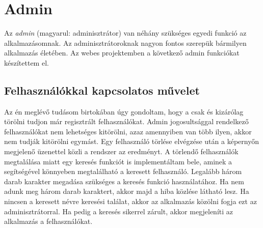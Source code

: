 \documentclass[]{thesis-ekf}
\theoremstyle{definition}
\theoremstyle{remark}
\begin{document}
	\section{Admin}
		Az \emph{admin} (magyarul: adminisztrátor) van néhány szükséges egyedi funkció az alkalmazásomnak. Az adminisztrátoroknak nagyon fontos szerepük bármilyen alkalmazás életében. Az webes projektemben a következő admin funkciókat készítettem el.
	\subsection{Felhasználókkal kapcsolatos művelet}
		Az én meglévő tudásom birtokában úgy gondoltam, hogy a csak és kizárólag törölni tudjon már regisztrált felhasználókat. Admin jogosultsággal rendelkező felhasználókat nem lehetséges kitörölni, azaz amennyiben van több ilyen, akkor nem tudják kitörölni egymást. Egy felhasználó törlése elvégzése után a képernyőn megjelenő üzenettel közli a rendszer az eredményt. A törlendő felhasználók megtalálása miatt egy keresés funkciót is implementáltam bele, aminek a segítségével könnyeben megtalálható a keresett felhasználó. Legalább három darab karakter megadása szükséges a keresés funkció használatához. Ha nem adunk meg három darab karaktert, akkor majd a hiba közlése látható lesz. Ha nincsen a keresett névre keresési találat, akkor az alkalmazás közölni fogja ezt az adminisztrátorral. Ha pedig a keresés sikerrel zárult, akkor megjeleníti az alkalmazás a felhasználókat.
\end{document}
